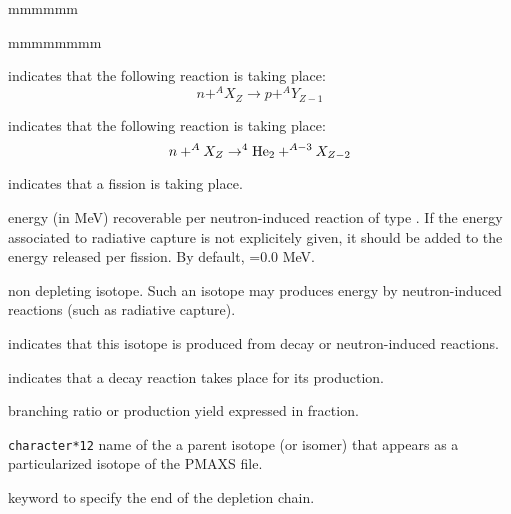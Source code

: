 \begin{ListeDeDescription}{mmmmmm}
\begin{ListeDeDescription}{mmmmmmmm}
\item[\moc{NP}] indicates that the following reaction is taking place:
$$ n +^{A}X_Z \to p + ^AY_{Z-1}$$

\item[\moc{NA}] indicates that the following reaction is taking place:
$$ n +^{A}X_Z \to ^4{\rm He}_2 + ^{A-3}X_{Z-2}$$

\item[\moc{NFTOT}] indicates that a fission is taking place.
\end{ListeDeDescription}

\item[\dusa{energy}] energy (in MeV) recoverable per neutron-induced
reaction of type . If the energy associated to radiative capture
is not explicitely given, it should be added to the energy released per fission. By
default, =0.0 MeV.

\item[\moc{STABLE}] non depleting isotope. Such an isotope may produces
energy by neutron-induced reactions (such as radiative capture).

\item[\moc{FROM}] indicates that this isotope is produced from decay or
neutron-induced reactions.

\item[\moc{DECAY}] indicates that a decay reaction takes place for its
production.

\item[\dusa{yield}] branching ratio or production yield expressed in fraction.

\item[\dusa{NAMPAR}] {\tt character*12} name of the a parent isotope
(or isomer) that appears as a particularized isotope of the PMAXS file.

\item[\moc{ENDCHAIN}] keyword to specify the end of the depletion chain.

\end{ListeDeDescription}

\clearpage

